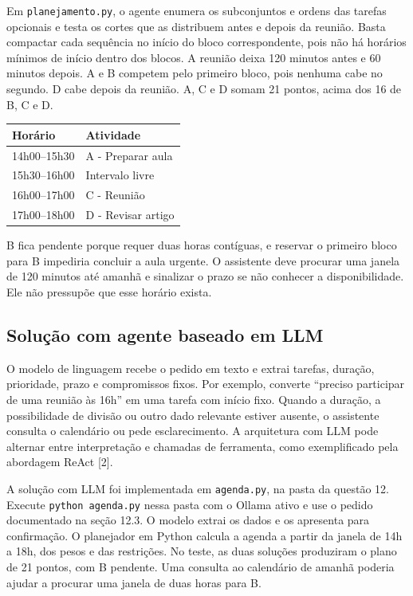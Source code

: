 \documentclass[12pt,a4paper]{article}
\begin{document}
Em \texttt{planejamento.py}, o agente enumera os subconjuntos e ordens das tarefas opcionais e testa os cortes que as distribuem antes e depois da reunião. Basta compactar cada sequência no início do bloco correspondente, pois não há horários mínimos de início dentro dos blocos. A reunião deixa 120 minutos antes e 60 minutos depois. A e B competem pelo primeiro bloco, pois nenhuma cabe no segundo. D cabe depois da reunião. A, C e D somam 21 pontos, acima dos 16 de B, C e D.

\begin{table}[htbp]
    \centering
    \begin{tabular}{>{\raggedright\arraybackslash}p{3.6cm} >{\raggedright\arraybackslash}p{7.5cm}}
        \toprule
        \textbf{Horário} & \textbf{Atividade} \\
        \midrule
        14h00--15h30 & A - Preparar aula \\
        \addlinespace
        15h30--16h00 & Intervalo livre \\
        \addlinespace
        16h00--17h00 & C - Reunião \\
        \addlinespace
        17h00--18h00 & D - Revisar artigo \\
        \bottomrule
    \end{tabular}
\end{table}

B fica pendente porque requer duas horas contíguas, e reservar o primeiro bloco para B impediria concluir a aula urgente. O assistente deve procurar uma janela de 120 minutos até amanhã e sinalizar o prazo se não conhecer a disponibilidade. Ele não pressupõe que esse horário exista.

\subsection{Solução com agente baseado em LLM}

O modelo de linguagem recebe o pedido em texto e extrai tarefas, duração, prioridade, prazo e compromissos fixos. Por exemplo, converte ``preciso participar de uma reunião às 16h'' em uma tarefa com início fixo. Quando a duração, a possibilidade de divisão ou outro dado relevante estiver ausente, o assistente consulta o calendário ou pede esclarecimento. A arquitetura com LLM pode alternar entre interpretação e chamadas de ferramenta, como exemplificado pela abordagem ReAct [2].

A solução com LLM foi implementada em \texttt{agenda.py}, na pasta da questão 12. Execute \texttt{python agenda.py} nessa pasta com o Ollama ativo e use o pedido documentado na seção 12.3. O modelo extrai os dados e os apresenta para confirmação. O planejador em Python calcula a agenda a partir da janela de 14h a 18h, dos pesos e das restrições. No teste, as duas soluções produziram o plano de 21 pontos, com B pendente. Uma consulta ao calendário de amanhã poderia ajudar a procurar uma janela de duas horas para B.
\end{document}
